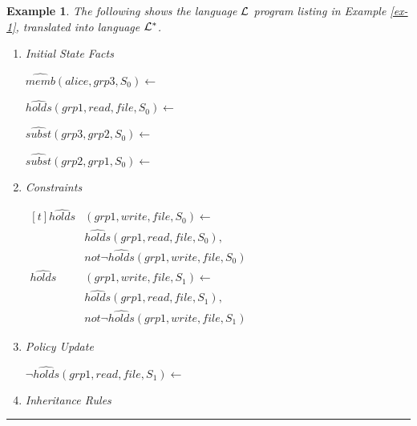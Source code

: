 \documentclass[11pt, twocolumn]{article}
\newtheorem{vexmpl}{Example}
\newenvironment{vexample}
  {\begin{vexmpl}\rm}
  {\rule{2mm}{2mm}\end{vexmpl}}
\begin{document}
        \begin{vexample}
          \label{ex-2}
          The following shows the language ${\cal L}$ program listing in
          Example \ref{ex-1},  translated into language ${\cal L}^{*}$.

          \begin{enumerate}
            \item
              Initial State Facts

              $\hat{memb}(alice, grp3, S_{0}) \leftarrow$

              $\hat{holds}(grp1, read, file,S_{0}) \leftarrow$

              $\hat{subst}(grp3, grp2, S_{0}) \leftarrow$

              $\hat{subst}(grp2, grp1, S_{0}) \leftarrow$

            \item
              Constraints

              \begin{math}
                \begin{aligned}[t]
                  \hat{holds}&(grp1, write, file, S_{0}) \leftarrow \\
                  & \hat{holds}(grp1, read, file, S_{0}), \\
                  & not \lnot \hat{holds}(grp1, write, file, S_{0}) \\
                  \hat{holds}&(grp1, write, file, S_{1}) \leftarrow \\
                  & \hat{holds}(grp1, read, file, S_{1}), \\
                  & not \lnot \hat{holds}(grp1, write, file, S_{1})
                \end{aligned}
              \end{math}

            \item
              Policy Update

              \begin{math}
                \lnot \hat{holds}(grp1, read, file, S_{1}) \leftarrow
              \end{math}

            \item
              Inheritance Rules


\end{enumerate}
\end{vexample}
\end{document}
